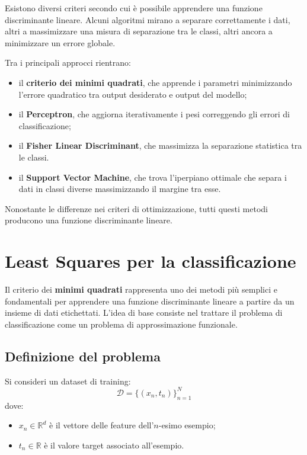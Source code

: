 \documentclass[a4paper,12pt]{report}
\begin{document}
Esistono diversi criteri secondo cui è possibile apprendere una funzione discriminante lineare.
Alcuni algoritmi mirano a separare correttamente i dati, altri a massimizzare una misura di separazione tra le classi, altri ancora a minimizzare un errore globale.

Tra i principali approcci rientrano:
\begin{itemize}
    \item il \textbf{criterio dei minimi quadrati}, che apprende i parametri minimizzando l’errore quadratico tra output desiderato e output del modello;
    \item il \textbf{Perceptron}, che aggiorna iterativamente i pesi correggendo gli errori di classificazione;
    \item il \textbf{Fisher Linear Discriminant}, che massimizza la separazione statistica tra le classi.
    \item il \textbf{Support Vector Machine}, che  trova l'iperpiano ottimale che separa i dati in classi diverse massimizzando il margine tra esse.
\end{itemize}

Nonostante le differenze nei criteri di ottimizzazione, tutti questi metodi producono una funzione discriminante lineare.

\section{Least Squares per la classificazione}

Il criterio dei \textbf{minimi quadrati} rappresenta uno dei metodi più semplici e fondamentali per apprendere una funzione discriminante lineare a partire da un insieme di dati etichettati.
L’idea di base consiste nel trattare il problema di classificazione come un problema di approssimazione funzionale.

\subsection{Definizione del problema}

Si consideri un dataset di training:
\[
\mathcal{D} = \{(x_n, t_n)\}_{n=1}^{N}
\]
dove:
\begin{itemize}
    \item \( x_n \in \mathbb{R}^d \) è il vettore delle feature dell’\(n\)-esimo esempio;
    \item \( t_n \in \mathbb{R} \) è il valore target associato all’esempio.
\end{itemize}
\end{document}
